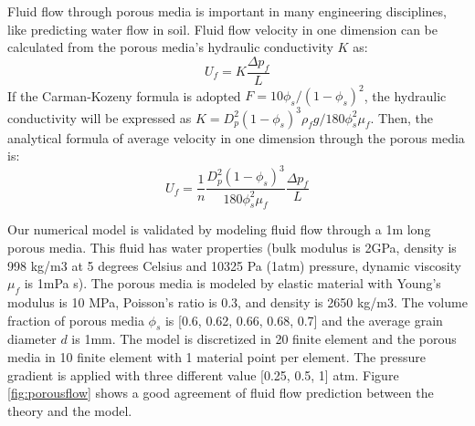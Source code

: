 \documentclass[preprint,12pt]{elsarticle}
\begin{document}
%
%
Fluid flow through porous media is important in many engineering disciplines, like predicting water flow in soil. Fluid flow velocity in one dimension can be calculated from the porous media's hydraulic conductivity $K$ as:\\
%
%
\begin{equation}
  {U}_f   = K \frac{\Delta p_f}{L}
\end {equation}
%
%
If the Carman-Kozeny formula is adopted $F = 10\phi_s/(1-\phi_s)^2$, the hydraulic conductivity will be expressed as  $K = D_p^2 (1-\phi_s)^3 \rho_f  g / 180 \phi_s^2  \mu_f $. Then, the analytical formula of average velocity in one dimension through the porous media is:\\
%
%
\begin{equation}
  {U}_f  = \frac{1}{n} \frac{D_p^2 (1-\phi_s)^3}{180 \phi_s^2 \mu_f} \frac{\Delta p_f}{L}
\end {equation}

%
%
Our numerical model is validated by modeling fluid flow through a 1m long porous media. This fluid has water properties (bulk modulus is 2GPa, density is 998 kg/m3 at 5 degrees Celsius and 10325 Pa (1atm) pressure, dynamic viscosity $\mu_f$ is 1mPa s). The porous media is modeled by elastic material with Young's modulus is 10 MPa, Poisson's ratio is 0.3, and density is 2650 kg/m3. The volume fraction of porous media $\phi_s$ is [0.6, 0.62, 0.66, 0.68, 0.7] and the average grain diameter $d$ is 1mm. The model is discretized in 20 finite element and the porous media in 10 finite element with 1 material point per element. The pressure gradient is applied with three different value [0.25, 0.5, 1] atm. Figure \ref{fig:porousflow} shows a good agreement of fluid flow prediction between the theory and the model. \\
%
\end{document}
